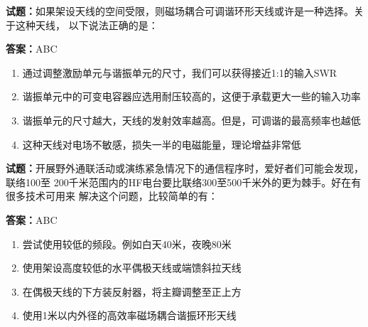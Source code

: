 \documentclass{ctexbook}
\begin{document}




\vspace{1em}

\textbf{试题：}如果架设天线的空间受限，则磁场耦合可调谐环形天线或许是一种选择。关于这种天线，
以下说法正确的是： 

\textbf{答案：}ABC 

\begin{enumerate}[leftmargin=3em]
  \item 通过调整激励单元与谐振单元的尺寸，我们可以获得接近1:1的输入SWR 

  \item 谐振单元中的可变电容器应选用耐压较高的，这便于承载更大一些的输入功率 

  \item 谐振单元的尺寸越大，天线的发射效率越高。但是，可调谐的最高频率也越低 

  \item 这种天线对电场不敏感，损失一半的电磁能量，理论增益非常低 

\end{enumerate}





\vspace{1em}

\textbf{试题：}开展野外通联活动或演练紧急情况下的通信程序时，爱好者们可能会发现，联络100至
200千米范围内的HF电台要比联络300至500千米外的更为棘手。好在有很多技术可用来
解决这个问题，比较简单的有： 

\textbf{答案：}ABC 

\begin{enumerate}[leftmargin=3em]
  \item 尝试使用较低的频段。例如白天40米，夜晚80米 

  \item 使用架设高度较低的水平偶极天线或端馈斜拉天线 

  \item 在偶极天线的下方装反射器，将主瓣调整至正上方 

  \item 使用1米以内外径的高效率磁场耦合谐振环形天线 

\end{enumerate}


\end{document}
